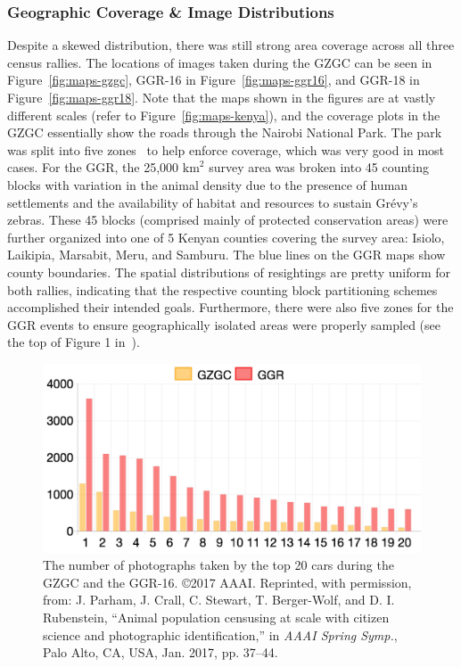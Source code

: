\subsubsection{Geographic Coverage \& Image Distributions}

Despite a skewed distribution, there was still strong area coverage across all three census rallies.  The locations of images taken during the GZGC can be seen in Figure~\ref{fig:maps-gzgc}, GGR-16 in Figure~\ref{fig:maps-ggr16}, and GGR-18 in Figure~\ref{fig:maps-ggr18}.  Note that the maps shown in the figures are at vastly different scales (refer to Figure~\ref{fig:maps-kenya}), and the coverage plots in the GZGC essentially show the roads through the Nairobi National Park.  The park was split into five zones~\cite{parham_photographic_2015} to help enforce coverage, which was very good in most cases.  For the GGR, the 25,000 $\textrm{km}^2$ survey area was broken into 45 counting blocks with variation in the animal density due to the presence of human settlements and the availability of habitat and resources to sustain Gr\'evy's zebras.  These 45 blocks (comprised mainly of protected conservation areas) were further organized into one of 5 Kenyan counties covering the survey area: Isiolo, Laikipia, Marsabit, Meru, and Samburu.  The blue lines on the GGR maps show county boundaries.  The spatial distributions of resightings are pretty uniform for both rallies, indicating that the respective counting block partitioning schemes accomplished their intended goals.  Furthermore, there were also five zones for the GGR events to ensure geographically isolated areas were properly sampled (see the top of Figure 1 in~\cite{parham_animal_2017}).

\begin{figure}[!t]
    \begin{center}
        \includegraphics[width=0.95\linewidth]{resources/images-per-car.pdf}
    \end{center}
    \caption{The number of photographs taken by the top 20 cars during the GZGC and the GGR-16.  \copyright 2017 AAAI. Reprinted, with permission, from: J. Parham, J. Crall, C. Stewart, T. Berger-Wolf, and D. I. Rubenstein, ``Animal population censusing at scale with citizen science and photographic identification,'' in \textit{AAAI Spring Symp.}, Palo Alto, CA, USA, Jan. 2017, pp. 37–44.}
    \label{fig:cars}
\end{figure}


